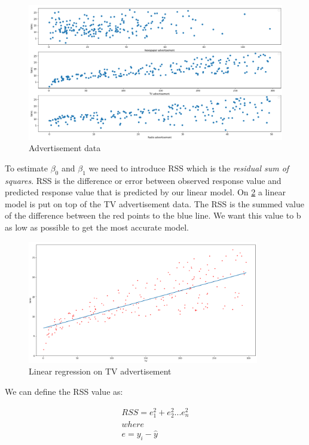 \begin{figure}[H]
	\centering
	\includegraphics[width=\textwidth]{Img/Advertisement_data.PNG}
	\caption{Advertisement data}
	\label{fig:Advertisement_data}
\end{figure} 

To estimate $\beta_0$ and $\beta_1$ we need to introduce RSS which is the \textit{residual sum of squares}. RSS is the difference or error between observed response value and predicted response value that is predicted by our linear model. On \cref{fig:TV_linear_reg} a linear model is put on top of the TV advertisement data. The RSS is the summed value of the difference between the red points to the blue line. We want this value to b as low as possible to get the most accurate model. 

\begin{figure}[H]
	\centering
	\includegraphics[width=0.9\textwidth]{Img/Regplot_tv.PNG}
	\caption{Linear regression on TV advertisement}
	\label{fig:TV_linear_reg}
\end{figure} 

We can define the RSS value as:


\begin{equation} \label{eq:RSS}
\begin{split}
RSS = e_{1}^{2}+e_{2}^{2}...e_{n}^{2} \\
where \\
e = y_{i}-\hat{y}
\end{split}
\end{equation} 

